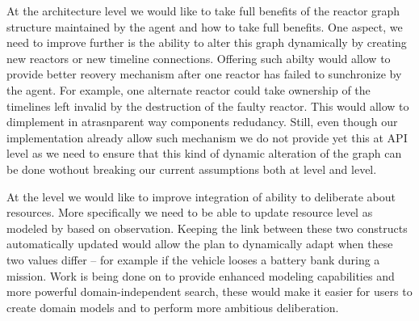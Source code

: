 At the architecture level we would like to take full benefits of the
reactor graph structure maintained by the agent and how to take full
benefits. One aspect, we need to improve further is the ability to
alter this graph dynamically by creating new reactors or new timeline
connections. Offering such abilty would allow to provide better
reovery mechanism after one reactor has failed to sunchronize by the 
agent. For example, one alternate reactor could take ownership of the
timelines left invalid by the destruction of the faulty reactor. This
would allow to dimplement in atrasnparent way components
redudancy. Still, even though our implementation already allow such
mechanism we do not provide yet this at \rx API level as we need to
ensure that this kind of dynamic alteration of the graph can be done
wothout breaking our current assumptions both at \rx level and \eu
level.

At the \eu level we would like to improve \rx
integration of \eu ability to deliberate about resources. More
specifically we need to be able to update resource level as 
modeled by \eu based on \rx observation.  
Keeping the link between these two constructs automatically updated 
would allow the plan to dynamically adapt when these two values differ -- 
for example if the vehicle looses a battery bank during a mission.
Work is being done on \eu to provide enhanced modeling
capabilities and more powerful domain-independent search, these
would make it easier for \rx users to create domain models and to 
perform more ambitious deliberation.







